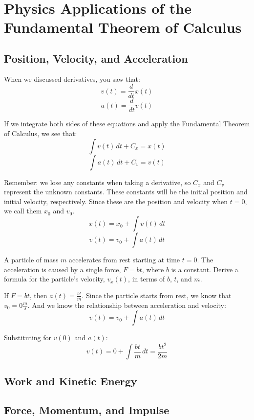 \chapter{Physics Applications of the Fundamental Theorem of Calculus}

\section{Position, Velocity, and Acceleration}

When we discussed derivatives, you saw that:
$$v(t) = \frac{d}{dt} x(t)$$
$$a(t) = \frac{d}{dt} v(t)$$

If we integrate both sides of these equations and apply the Fundamental Theorem of Calculus, we see that:
$$\int v(t)\,dt + C_x = x(t)$$
$$\int a(t)\,dt + C_v = v(t)$$

Remember: we lose any constants when taking a derivative, so $C_x$ and $C_v$ represent the unknown constants. These constants will be the initial position and initial velocity, respectively. Since these are the position and velocity when $t = 0$, we call them $x_0$ and $v_0$. 
$$x(t) = x_0 + \int v(t)\,dt$$
$$v(t) = v_0 + \int a(t)\,dt$$


\begin{Exercise} A particle of mass $m$ accelerates
from rest starting at time $t = 0$. The acceleration is caused by a single force, 
$F = bt$, where $b$ is a constant. Derive a formula for the particle's velocity, 
$v_x(t)$, in terms of $b$, $t$, and $m$. 
\vspace{50mm}
\end{Exercise}

\begin{Answer}[ref = velocity]
If $F = bt$, then $a(t) = \frac{bt}{m}$. Since the particle starts from rest, we 
know that $v_0 = 0 \frac{m}{s}$. And we know the relationship between acceleration
and velocity:
$$v(t) = v_0 + \int a(t) \, dt$$

Substituting for $v(0)$ and $a(t)$:
$$v(t) = 0 + \int \frac{bt}{m} \, dt = \frac{bt^2}{2m}$$
\end{Answer}

\section{Work and Kinetic Energy}

\section{Force, Momentum, and Impulse}

